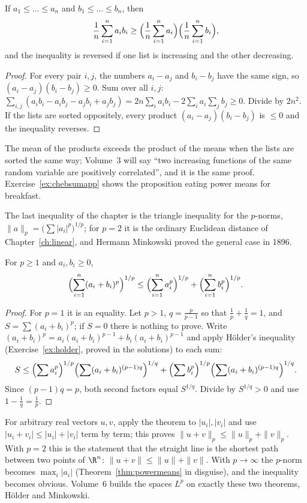 \begin{proposition}\label{prop:chebsum}
If $a_1\le\dots\le a_n$ and $b_1\le\dots\le b_n$, then
\[
\frac1n\sum_{i=1}^na_ib_i\ge\Bigl(\frac1n\sum_{i=1}^na_i\Bigr)\Bigl(\frac1n\sum_{i=1}^nb_i\Bigr),
\]
and the inequality is reversed if one list is increasing and the other decreasing.
\end{proposition}
\begin{proof}
For every pair $i,j$, the numbers $a_i-a_j$ and $b_i-b_j$ have the same sign, so $(a_i-a_j)(b_i-b_j)\ge0$. Sum over all $i,j$:
$\sum_{i,j}(a_ib_i-a_ib_j-a_jb_i+a_jb_j)=2n\sum_ia_ib_i-2\sum_ia_i\sum_jb_j\ge0$. Divide by $2n^2$. If the lists are sorted oppositely, every
product $(a_i-a_j)(b_i-b_j)$ is $\le0$ and the inequality reverses.
\end{proof}

The mean of the products exceeds the product of the means when the lists are sorted the same way; Volume~3 will say ``two increasing functions of
the same random variable are positively correlated'', and it is the same proof. Exercise~\ref{ex:chebsumapp} shows the proposition eating power means
for breakfast.

The last inequality of the chapter is the triangle inequality for the $p$-norms, $\|a\|_p=\bigl(\sum|a_i|^p\bigr)^{1/p}$; for $p=2$ it is the
ordinary Euclidean distance of Chapter~\ref{ch:linear}, and Hermann Minkowski proved the general case in 1896.

\begin{theorem}[Minkowski]\label{thm:minkowski}
For $p\ge1$ and $a_i,b_i\ge0$,
\[
\Bigl(\sum_{i=1}^n(a_i+b_i)^p\Bigr)^{1/p}\le\Bigl(\sum_{i=1}^na_i^p\Bigr)^{1/p}+\Bigl(\sum_{i=1}^nb_i^p\Bigr)^{1/p}.
\]
\end{theorem}
\begin{proof}
For $p=1$ it is an equality. Let $p>1$, $q=\frac p{p-1}$ so that $\frac1p+\frac1q=1$, and $S=\sum(a_i+b_i)^p$; if $S=0$ there is nothing to prove. Write
$(a_i+b_i)^p=a_i(a_i+b_i)^{p-1}+b_i(a_i+b_i)^{p-1}$ and apply H\"older's inequality (Exercise~\ref{ex:holder}, proved in the solutions) to each sum:
\[
S\le\Bigl(\sum a_i^p\Bigr)^{1/p}\Bigl(\sum(a_i+b_i)^{(p-1)q}\Bigr)^{1/q}+\Bigl(\sum b_i^p\Bigr)^{1/p}\Bigl(\sum(a_i+b_i)^{(p-1)q}\Bigr)^{1/q}.
\]
Since $(p-1)q=p$, both second factors equal $S^{1/q}$. Divide by $S^{1/q}>0$ and use $1-\frac1q=\frac1p$.
\end{proof}

For arbitrary real vectors $u,v$, apply the theorem to $|u_i|,|v_i|$ and use
$|u_i+v_i|\le|u_i|+|v_i|$ term by term; this proves
$\|u+v\|_p\le\|u\|_p+\|v\|_p$. With $p=2$ this is the statement that the straight line is the shortest path between two points of $\R^n$: $\|u+v\|\le\|u\|+\|v\|$. With $p\to\infty$
the $p$-norm becomes $\max_i|a_i|$ (Theorem~\ref{thm:powermeans} in disguise), and the inequality becomes obvious. Volume~6 builds the spaces $L^p$
on exactly these two theorems, H\"older and Minkowski.

